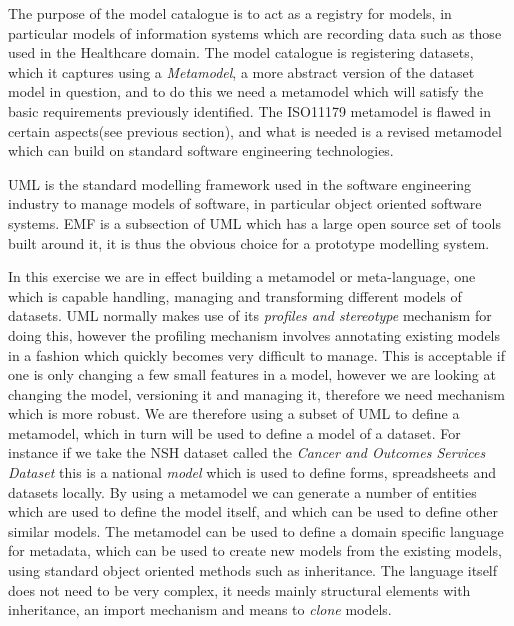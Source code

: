 \documentclass{article}
\begin{document}
The purpose of the model catalogue is to act as a registry for models, in particular models of information systems which are recording data such as those used in the Healthcare domain. The model catalogue is registering datasets, which it captures using a \emph{Metamodel}, a more abstract version of the dataset model in question, and to do this we need a metamodel which will satisfy the basic requirements previously identified. The ISO11179 metamodel is flawed in certain aspects(see previous section), and what is needed is a revised metamodel which can build on standard software engineering technologies.

UML is the standard modelling framework used in the software engineering industry to manage models of software, in particular object oriented software systems. EMF is a subsection of UML which has a large open source set of tools built around it, it is thus the obvious choice for a prototype modelling system.

In this exercise we are in effect building a metamodel or meta-language, one which is capable handling, managing and transforming different models of datasets. UML normally makes use of its \emph{profiles and stereotype} mechanism for doing this, however the profiling mechanism involves annotating existing models in a fashion which quickly becomes very difficult to manage. This is acceptable if one is only changing a few small features in a model, however we are looking at changing the model, versioning it and managing it, therefore we need mechanism which is more robust. We are therefore using a subset of UML to define a metamodel, which in turn will be used to define a model of a dataset. For instance if we take the NSH dataset called the \emph{Cancer and Outcomes Services Dataset} this is a national \emph{model} which is used to define forms, spreadsheets and datasets locally. By using a metamodel we can generate a number of entities which are used to define the model itself, and which can be used to define other similar models. The metamodel can be used to define a domain specific language for metadata, which can be used to create new models from the existing models, using standard object oriented methods such as inheritance. The language itself does not need to be very complex, it needs mainly structural elements with inheritance, an import mechanism and means to \emph{clone} models.
\end{document}

